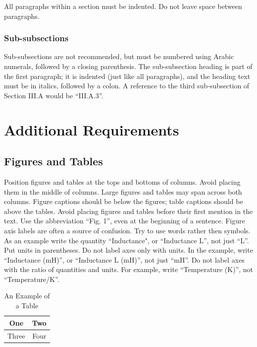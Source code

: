 \documentclass[letterpaper, 10 pt, conference]{ieeeconf}  %
\begin{document}
All paragraphs within a section must be indented.  Do not leave space between
paragraphs.

\subsubsection{Sub-subsections} Sub-subsections are not recommended, but must be 
numbered using Arabic numerals, followed by a closing parenthesis.  The sub-subsection 
heading is part of the first paragraph; it is indented (just like all paragraphs), 
and the heading text must be in italics, followed by a colon.  A reference to the 
third sub-subsection of Section III.A would be ``III.A.3''.

\section{Additional Requirements}

\subsection{Figures and Tables}

Position figures and tables at the tops and bottoms of columns.
Avoid placing them in the middle of columns. Large figures and tables
may span across both columns. Figure captions should be below the figures;
 table captions should be above the tables. Avoid placing figures and tables
  before their first mention in the text. Use the abbreviation ``Fig. 1'',
  even at the beginning of a sentence.
Figure axis labels are often a source of confusion.
Try to use words rather then symbols. As an example write the quantity ``Inductance",
 or ``Inductance L'', not just ``L''.
 Put units in parentheses. Do not label axes only with units.
 In the example, write ``Inductance (mH)'', or ``Inductance L (mH)'', not just ``mH''.
 Do not label axes with the ratio of quantities and units.
 For example, write ``Temperature (K)'', not ``Temperature/K''.

\begin{table}[t]
\caption{An Example of a Table}
\label{table_example}
\begin{center}
\begin{tabular}{|c||c|}
\hline
One & Two\\
\hline
Three & Four\\
\hline
\end{tabular}
\end{center}
\end{table}
\end{document}
